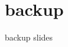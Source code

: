 \documentclass[compress]{beamer}
\begin{document}
    
\section*{backup}
\begin{frame}
backup slides
\end{frame}

% 

\end{document}
